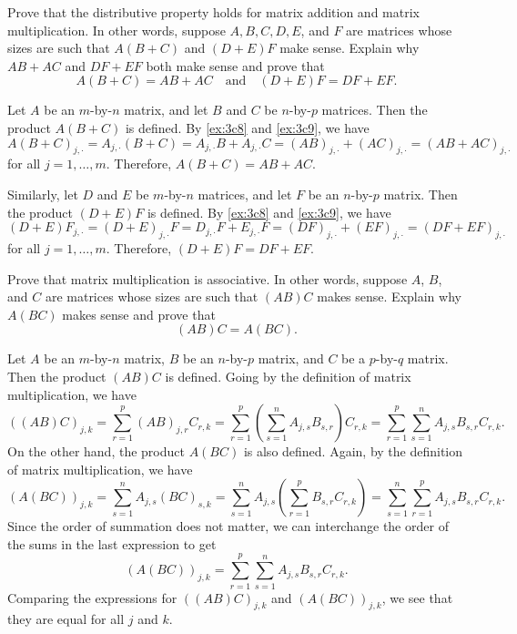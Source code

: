 \begin{exercise}[3c11]
    Prove that the distributive property holds for matrix addition and matrix multiplication. In other words, suppose $A, B, C, D, E$, and $F$ are matrices whose sizes are such that $A(B + C)$ and $(D + E)F$ make sense. Explain why $AB + AC$ and $DF + EF$ both make sense and prove that
    \[A(B + C) = AB + AC \quad \text{and} \quad (D + E)F = DF + EF.\]
\end{exercise}

\begin{sol}
    Let $A$ be an $m$-by-$n$ matrix, and let $B$ and $C$ be $n$-by-$p$ matrices. Then the product $A(B + C)$ is defined. By \autoref{ex:3c8} and \autoref{ex:3c9}, we have
    \[A(B + C)_{j, \cdot} = A_{j, \cdot} (B + C) = A_{j, \cdot} B + A_{j, \cdot} C = (AB)_{j, \cdot} + (AC)_{j, \cdot} = (AB + AC)_{j, \cdot}\]
    for all $j = 1, \ldots, m$. Therefore, $A(B + C) = AB + AC$.

    Similarly, let $D$ and $E$ be $m$-by-$n$ matrices, and let $F$ be an $n$-by-$p$ matrix. Then the product $(D + E)F$ is defined. By \autoref{ex:3c8} and \autoref{ex:3c9}, we have
    \[(D + E)F_{j, \cdot} = (D + E)_{j, \cdot} F = D_{j, \cdot} F + E_{j, \cdot} F = (DF)_{j, \cdot} + (EF)_{j, \cdot} = (DF + EF)_{j, \cdot}\]
    for all $j = 1, \ldots, m$. Therefore, $(D + E)F = DF + EF$.
\end{sol}

\begin{exercise}[3c12]
    Prove that matrix multiplication is associative. In other words, suppose $A$, $B$, and $C$ are matrices whose sizes are such that $(AB)C$ makes sense. Explain why $A(BC)$ makes sense and prove that
    \[(AB)C = A(BC).\]
\end{exercise}

\begin{sol}
    Let $A$ be an $m$-by-$n$ matrix, $B$ be an $n$-by-$p$ matrix, and $C$ be a $p$-by-$q$ matrix. Then the product $(AB)C$ is defined. Going by the definition of matrix multiplication, we have
    \[((AB)C)_{j, k} = \sum_{r = 1}^{p} (AB)_{j, r} C_{r, k} = \sum_{r = 1}^{p} \left( \sum_{s = 1}^{n} A_{j, s} B_{s, r} \right) C_{r, k} = \sum_{r = 1}^{p} \sum_{s = 1}^{n} A_{j, s} B_{s, r} C_{r, k}.\]
    On the other hand, the product $A(BC)$ is also defined. Again, by the definition of matrix multiplication, we have
    \[(A(BC))_{j, k} = \sum_{s = 1}^{n} A_{j, s} (BC)_{s, k} = \sum_{s = 1}^{n} A_{j, s} \left( \sum_{r = 1}^{p} B_{s, r} C_{r, k} \right) = \sum_{s = 1}^{n} \sum_{r = 1}^{p} A_{j, s} B_{s, r} C_{r, k}.\]
    Since the order of summation does not matter, we can interchange the order of the sums in the last expression to get
    \[(A(BC))_{j, k} = \sum_{r = 1}^{p} \sum_{s = 1}^{n} A_{j, s} B_{s, r} C_{r, k}.\]
    Comparing the expressions for $((AB)C)_{j, k}$ and $(A(BC))_{j, k}$, we see that they are equal for all $j$ and $k$.
\end{sol}

